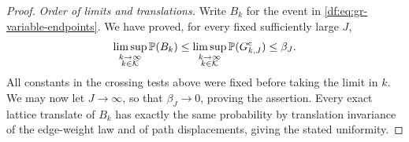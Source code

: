 \begin{proof}
\emph{Order of limits and translations.}
Write $B_k$ for the event in \eqref{df:eq:gr-variable-endpoints}. We have
proved, for every fixed sufficiently large $J$,
\[
 \limsup_{\substack{k\to\infty\\k\in\mathcal K}}\mathbb P(B_k)
 \leq\limsup_{\substack{k\to\infty\\k\in\mathcal K}}
       \mathbb P(G_{k,J}^{\mathrm c})
 \leq\beta_J.
\]
All constants in the crossing tests above were fixed before taking
the limit in $k$. We may now let $J\to\infty$, so that
$\beta_J\to0$, proving the assertion. Every exact lattice
translate of $B_k$ has exactly the same probability by translation
invariance of the edge-weight law and of path displacements, giving
the stated uniformity.
\end{proof}

